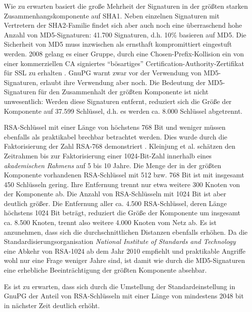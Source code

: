 Wie zu erwarten basiert die große Mehrheit der Signaturen in der
größten starken Zusammenhangskomponente auf SHA1. Neben einzelnen
Signaturen mit Vertretern der SHA2-Familie findet sich aber auch noch
eine überraschend hohe Anzahl von MD5-Signaturen: 41.700 Signaturen,
d.h. 10\% basieren auf MD5. Die Sicherheit von MD5 muss inzwischen als
ernsthaft kompromittiert eingestuft werden. 2008 gelang es einer
Gruppe, durch eine Chosen-Prefix-Kollision ein von einer kommerziellen
CA signiertes "`bösartiges"' Certification-Authority-Zertifikat
für SSL zu erhalten \cite{Stevens2009}. GnuPG warnt zwar vor der
Verwendung von MD5-Signaturen, erlaubt ihre Verwendung aber noch. Die
Bedeutung der MD5-Signaturen für den Zusammenhalt der größten
Komponente ist nicht unwesentlich: Werden diese Signaturen entfernt,
reduziert sich die Größe der Komponente auf 37.599 Schlüssel,
d.h. es werden ca. 8.000 Schlüssel abgetrennt. 

RSA-Schlüssel mit einer Länge von höchstens 768 Bit und weniger
müssen ebenfalls als praktikabel brechbar betrachtet werden. Dies
wurde durch die Faktorisierung der Zahl RSA-768 demonstriert
\cite{Kleinjung2010}. Kleinjung et al. schätzen den Zeitrahmen bis
zur Faktorisierung einer 1024-Bit-Zahl innerhalb eines
\emph{akademischen Rahmens} auf 5 bis 10 Jahre. Die Menge der in der
größten Komponente vorhandenen RSA-Schlüssel mit 512 bzw. 768 Bit
ist mit insgesamt 450 Schlüsseln gering. Ihre Entfernung trennt nur
etwa weitere 300 Knoten von der Komponente ab. Die Anzahl von
RSA-Schlüsseln mit 1024 Bit ist aber deutlich größer. Die
Entfernung aller ca. 4.500 RSA-Schlüssel, deren Länge höchstens
1024 Bit beträgt, reduziert die Größe der Komponente um insgesamt
ca. 8.500 Knoten, trennt also weitere 4.000 Knoten vom Netz ab. Es ist
anzunehmen, dass sich die durchschnittlichen Distanzen ebenfalls
erhöhen. Da die Standardisierungsorganisation \emph{National Institute
 of Standards and Technology} 
  eine Abkehr von RSA-1024
ab dem Jahr 2010 empfiehlt \cite{NIST2007} und praktikable Angriffe
wohl nur eine Frage weniger Jahre sind, ist damit wie durch die
MD5-Signaturen eine erhebliche Beeinträchtigung der größten
Komponente absehbar.

Es ist zu erwarten, dass sich durch die Umstellung der
Standardeinstellung in GnuPG der Anteil von RSA-Schlüsseln mit
einer Länge von mindestens 2048 bit in nächster Zeit deutlich
erhöht.



